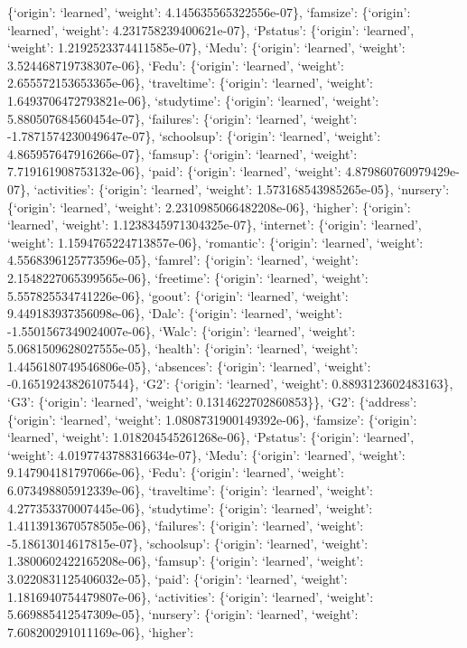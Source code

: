 \documentclass[
]{article}
\begin{document}
\{`origin': `learned', `weight': 4.145635565322556e-07\}, `famsize':
\{`origin': `learned', `weight': 4.231758239400621e-07\}, `Pstatus':
\{`origin': `learned', `weight': 1.2192523374411585e-07\}, `Medu':
\{`origin': `learned', `weight': 3.524468719738307e-06\}, `Fedu':
\{`origin': `learned', `weight': 2.655572153653365e-06\}, `traveltime':
\{`origin': `learned', `weight': 1.6493706472793821e-06\}, `studytime':
\{`origin': `learned', `weight': 5.880507684560454e-07\}, `failures':
\{`origin': `learned', `weight': -1.7871574230049647e-07\}, `schoolsup':
\{`origin': `learned', `weight': 4.865957647916266e-07\}, `famsup':
\{`origin': `learned', `weight': 7.719161908753132e-06\}, `paid':
\{`origin': `learned', `weight': 4.879860760979429e-07\}, `activities':
\{`origin': `learned', `weight': 1.573168543985265e-05\}, `nursery':
\{`origin': `learned', `weight': 2.2310985066482208e-06\}, `higher':
\{`origin': `learned', `weight': 1.1238345971304325e-07\}, `internet':
\{`origin': `learned', `weight': 1.1594765224713857e-06\}, `romantic':
\{`origin': `learned', `weight': 4.5568396125773596e-05\}, `famrel':
\{`origin': `learned', `weight': 2.1548227065399565e-06\}, `freetime':
\{`origin': `learned', `weight': 5.557825534741226e-06\}, `goout':
\{`origin': `learned', `weight': 9.449183937356098e-06\}, `Dalc':
\{`origin': `learned', `weight': -1.5501567349024007e-06\}, `Walc':
\{`origin': `learned', `weight': 5.0681509628027555e-05\}, `health':
\{`origin': `learned', `weight': 1.4456180749546806e-05\}, `absences':
\{`origin': `learned', `weight': -0.16519243826107544\}, `G2':
\{`origin': `learned', `weight': 0.8893123602483163\}, `G3': \{`origin':
`learned', `weight': 0.1314622702860853\}\}, `G2': \{`address':
\{`origin': `learned', `weight': 1.0808731900149392e-06\}, `famsize':
\{`origin': `learned', `weight': 1.018204545261268e-06\}, `Pstatus':
\{`origin': `learned', `weight': 4.0197743788316634e-07\}, `Medu':
\{`origin': `learned', `weight': 9.147904181797066e-06\}, `Fedu':
\{`origin': `learned', `weight': 6.073498805912339e-06\}, `traveltime':
\{`origin': `learned', `weight': 4.277353370007445e-06\}, `studytime':
\{`origin': `learned', `weight': 1.4113913670578505e-06\}, `failures':
\{`origin': `learned', `weight': -5.18613014617815e-07\}, `schoolsup':
\{`origin': `learned', `weight': 1.3800602422165208e-06\}, `famsup':
\{`origin': `learned', `weight': 3.0220831125406032e-05\}, `paid':
\{`origin': `learned', `weight': 1.1816940754479807e-06\}, `activities':
\{`origin': `learned', `weight': 5.669885412547309e-05\}, `nursery':
\{`origin': `learned', `weight': 7.608200291011169e-06\}, `higher':
\end{document}
